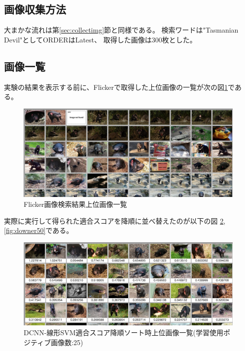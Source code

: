 \documentclass[11pt,a4paper, uplatex]{jsreport}
\begin{document}
\subsection{画像収集方法}
大まかな流れは第\ref{sec:collectimg}節と同様である。
検索ワードは"Tasmanian Devil"としてORDERはLatest、
取得した画像は300枚とした。
\subsection{画像一覧}
実験の結果を表示する前に、Flickerで取得した上位画像の一覧が次の図\ref{fig:flicker}である。
\begin{figure}[t]
  \begin{center}
    \includegraphics[scale=0.25,angle=90]{imgs/raw-upper.jpg}
  \end{center}
  \caption{Flicker画像検索結果上位画像一覧}
  \label{fig:flicker}
\end{figure}
実際に実行して得られた適合スコアを降順に並べ替えたのが以下の図
\ref{fig:downer25}, \ref{fig:downer50}である。
\begin{figure}[t]
  \begin{center}
    \includegraphics[scale=0.25,angle=90]{imgs/score25-upper.jpg}
    \caption{DCNN-線形SVM適合スコア降順ソート時上位画像一覧(学習使用ポジティブ画像数:25)}
    \label{fig:downer25}
  \end{center}
\end{figure}
\end{document}

